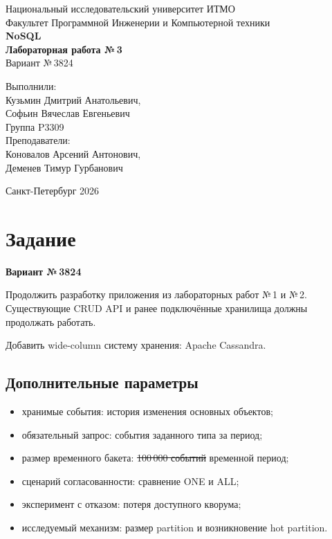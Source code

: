 \documentclass[12pt,a4paper]{article}
\begin{document}
\begin{titlepage}
\begin{center}
    \LARGE Национальный исследовательский университет ИТМО\\[8mm]
    Факультет Программной Инженерии и Компьютерной техники\\[37mm]
    \huge \textbf{NoSQL}\\[2mm]
    \textbf{Лабораторная работа №\,3}\\[2mm]
    \Large Вариант №\,3824
\end{center}

\vfill

\begin{flushright}
    \large Выполнили:\\
    Кузьмин Дмитрий Анатольевич,\\
    Софьин Вячеслав Евгеньевич\\[3mm]
    Группа P3309\\[3mm]
    Преподаватели:\\
    Коновалов Арсений Антонович,\\
    Деменев Тимур Гурбанович
\end{flushright}

\vfill

\begin{center}
    Санкт-Петербург 2026
\end{center}
\end{titlepage}

\section{Задание}

\textbf{Вариант №\,3824}

Продолжить разработку приложения из лабораторных работ №\,1 и №\,2. Существующие CRUD API и ранее подключённые хранилища должны продолжать работать.

Добавить wide-column систему хранения: Apache Cassandra.

\subsection*{Дополнительные параметры}

\begin{itemize}
    \item хранимые события: история изменения основных объектов;
    \item обязательный запрос: события заданного типа за период;
    \item размер временного бакета: \sout{100\,000 событий} временной период;
    \item сценарий согласованности: сравнение ONE и ALL;
    \item эксперимент с отказом: потеря доступного кворума;
    \item исследуемый механизм: размер partition и возникновение hot partition.
\end{itemize}
\end{document}
